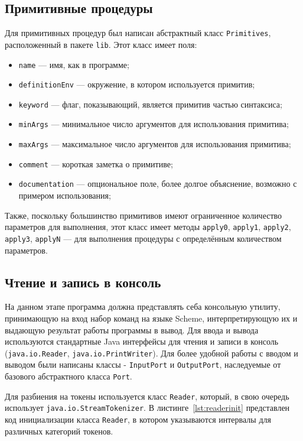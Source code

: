 \documentclass[14pt, russian]{scrartcl}
\begin{document}
\subsection{Примитивные процедуры}

Для примитивных процедур был написан абстрактный класс \texttt{Primitives}, расположенный в пакете \texttt{lib}.
Этот класс имеет поля:
\begin{itemize} %
\item \texttt{name} --- имя, как в программе;
\item \texttt{definitionEnv} --- окружение, в котором используется примитив;
\item \texttt{keyword} --- флаг, показывающий, является примитив частью синтаксиса;
\item \texttt{minArgs} --- минимальное число аргументов для использования примитива;
\item \texttt{maxArgs} --- максимальное число аргументов для использования примитива;
\item \texttt{comment} --- короткая заметка о примитиве;
\item \texttt{documentation} --- опциональное поле, более долгое объяснение, возможно с примером использования;
\end{itemize}

Также, поскольку большинство примитивов имеют ограниченное количество параметров для выполнения, этот класс имеет методы \texttt{apply0}, \texttt{apply1}, \texttt{apply2}, \texttt{apply3}, \texttt{applyN} --- для выполнения процедуры с определённым количеством параметров.

\subsection{Чтение и запись в консоль}

На данном этапе программа должна представлять себа консольную утилиту, принимающую на вход набор команд на языке Scheme, интерпретирующую их и выдающую результат работы программы в вывод. Для ввода и вывода используются стандартные Java интерфейсы для чтения и записи в консоль (\texttt{java.io.Reader}, \texttt{java.io.PrintWriter}). Для более удобной работы с вводом и выводом были написаны классы - \texttt{InputPort} и \texttt{OutputPort}, наследуемые от базового абстрактного класса \texttt{Port}.

Для разбиения на токены используется класс \texttt{Reader}, который, в свою очередь использует \texttt{java.io.StreamTokenizer}.
В листинге~\ref{lst:readerinit} представлен код инициализации класса \texttt{Reader}, в  котором указываются интервалы для различных категорий токенов.
\end{document}
